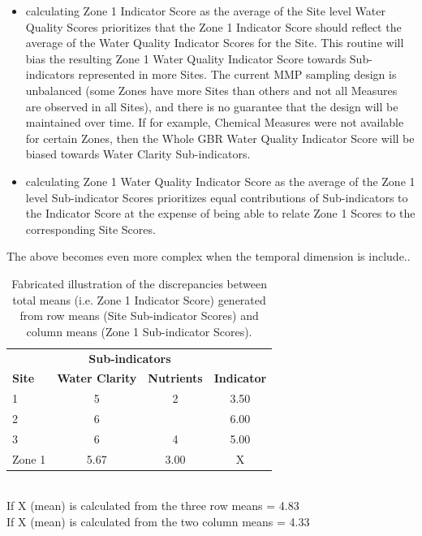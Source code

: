 \begin{itemize}
\itemsep1pt\parskip0pt
\item calculating Zone 1 Indicator Score as the average of the Site level Water Quality Scores
prioritizes that the Zone 1 Indicator Score should reflect the average of the Water Quality
Indicator Scores for the Site. This routine will bias the resulting Zone 1 Water Quality Indicator
Score towards Sub-indicators represented in more Sites.  The current MMP sampling design is
unbalanced (some Zones have more Sites than others and not all Measures are observed in all Sites),
and there is no guarantee that the design will be maintained over time. If for example, Chemical
Measures were not available for certain Zones, then the Whole GBR Water Quality Indicator Score will
be biased towards Water Clarity Sub-indicators.
\item calculating Zone 1 Water Quality Indicator Score as the average of the Zone 1 level
Sub-indicator Scores prioritizes equal contributions of Sub-indicators to the Indicator Score at the
expense of being able to relate Zone 1 Scores to the corresponding Site Scores.
\end{itemize}

The above becomes even more complex when the temporal dimension is include..

\begin{table}[htb]
\centering\scriptsize\scriptsize
\begin{minipage}{0.57\linewidth}
\caption{Fabricated illustration of the discrepancies between total means (i.e. Zone 1 Indicator Score) generated from row means (Site Sub-indicator Scores) and column means (Zone 1 Sub-indicator Scores).}\label{tab:complexity}
\scriptsize
\begin{tabular}{l|cc||c}
\toprule
&\multicolumn{2}{c}{\textbf{Sub-indicators}}&\\
\cmidrule(rl){2-3}
\textbf{Site}&\textbf{Water Clarity}&\textbf{Nutrients}&\textbf{Indicator}\\
\midrule
1&5&2&3.50\\
2&6&&6.00\\
3&6&4&5.00\\
\midrule
Zone 1&5.67&3.00&X\\
\bottomrule
\end{tabular}\\
If X (mean) is calculated from the three row means = 4.83\\
If X (mean) is calculated from the two column means = 4.33
\end{minipage}
\end{table}



